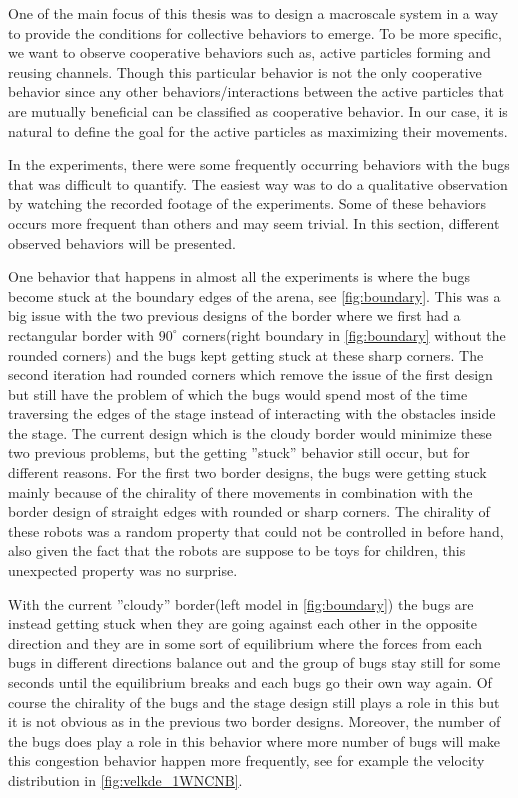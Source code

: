 One of the main focus of this thesis was to design a macroscale 
system in a way to provide the conditions for collective behaviors 
to emerge. To be more specific, we want to observe cooperative 
behaviors such as, active particles forming and reusing channels. 
Though this particular behavior is not the only cooperative behavior 
since any other behaviors/interactions between the active particles 
that are mutually beneficial can be classified as cooperative behavior. 
In our case, it is natural to define the goal for the active 
particles as maximizing their movements.

In the experiments, there were some frequently occurring behaviors 
with the bugs that was difficult to quantify. The easiest way 
was to do a qualitative observation by watching the recorded 
footage of the experiments. Some of these behaviors occurs more 
frequent than others and may seem trivial. In this section, 
different observed behaviors will be presented. 

One behavior that happens in almost all the experiments is where the 
bugs become stuck at the boundary edges of the arena, see \cref{fig:boundary}. 
This was a big issue with the two previous designs of the border 
where we first had a rectangular border with $90^\circ$ 
corners(right boundary in \cref{fig:boundary} without the rounded corners) 
and the bugs kept getting stuck at these sharp corners. 
The second iteration had rounded corners which remove the 
issue of the first design but still have the problem of which the bugs 
would spend most of the time traversing the edges of the stage 
instead of interacting with the obstacles inside the stage. 
The current design which is the cloudy border would minimize 
these two previous problems, but the getting ''stuck'' behavior 
still occur, but for different reasons. For the first two border designs, 
the bugs were getting stuck mainly because of the chirality of there 
movements in combination with the border design of straight edges with 
rounded or sharp corners. The chirality of these robots was a 
random property that could not be controlled in before hand, 
also given the fact that the robots are suppose to be toys for children, 
this unexpected property was no surprise. 

With the current ''cloudy'' border(left model in \cref{fig:boundary}) 
the bugs are instead getting stuck when they are going against each 
other in the opposite direction and they are in some sort 
of equilibrium where the forces from each bugs in different 
directions balance out and the group of bugs stay still 
for some seconds until the equilibrium breaks and each bugs go 
their own way again. Of course the chirality of the bugs 
and the stage design still plays a role in this but it is not 
obvious as in the previous two border designs. Moreover, the 
number of the bugs does play a role in this behavior where 
more number of bugs will make this congestion behavior happen 
more frequently, see for example the velocity distribution in 
\cref{fig:velkde_1WNCNB}.

